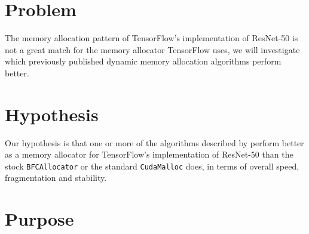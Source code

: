 \documentclass[12pt,twoside]{article}
\begin{document}
\section{Problem}
\label{sec:problem}



The memory allocation pattern of TensorFlow's implementation of ResNet-50 is not a great match for the memory allocator TensorFlow uses, we will investigate which previously published dynamic memory allocation algorithms perform better.



\section{Hypothesis}
\label{sec:hypothesis}


Our hypothesis is that one or more of the algorithms described by \citeauthor{Vinkler2015} \cite{Vinkler2015} perform better as a memory allocator for TensorFlow's implementation of ResNet-50 than the stock \texttt{BFCAllocator} or the standard \texttt{CudaMalloc} does, in terms of overall speed, fragmentation and stability.


\section{Purpose}
\label{sec:purpose}

\end{document}
